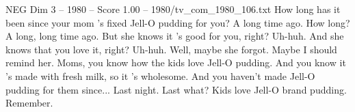 \begin{textsample}{NEG Dim 3 – 1980 – Score 1.00 – 1980/tv\_com\_1980\_106.txt}  \label{ex:f3_neg_048}
How long has it been since your mom 's fixed Jell-O pudding for you?
A long time ago.
How long?
A long, long time ago.
But she knows it 's good for you, right?
Uh-huh.
And she knows that you love it, right?
Uh-huh.
Well, maybe she forgot.
Maybe I should remind her.
Moms, you know how the kids love Jell-O pudding.
And you know it 's made with fresh milk, so it 's wholesome.
And you haven't made Jell-O pudding for them since...
Last night.
Last what?
Kids love Jell-O brand pudding.
Remember.

\end{textsample}

